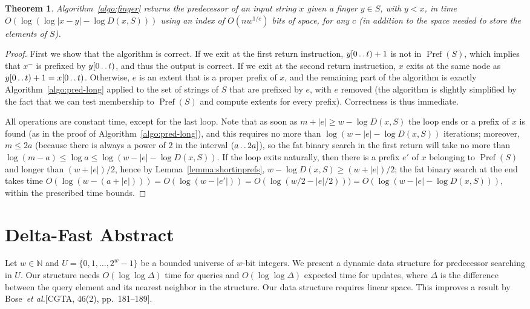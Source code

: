 \documentclass[a4paper,11pt]{article}
\newtheorem{theorem}{Theorem}[section]
\newcommand{\N}{\mathbb{N}}
\newcommand{\etal}{\emph{et al.}\xspace}
\newcommand{\?}{\mskip1.5mu}
\def\..{\,\mathpunct{\ldotp\ldotp}} %
\DeclareMathOperator{\Pref}{Pref}
\begin{document}
\begin{theorem}
\label{th:finger}
Algorithm~\ref{algo:finger} returns the predecessor of an input string $x$ given
a finger $y\in S$, with $y<x$, in time $O(\log(\log|x-y|-\log D(x,S)))$ using an 
index of $O(n w^{1/c})$ bits 
of space, for any $c$ (in addition to the space needed to store the elements of $S$).
\end{theorem}
\begin{proof}
First we show that the algorithm is correct. 
If we exit at the first return instruction, $y[0\..t)+1$ is
not in $\Pref(S)$, which implies that $x^-$ is prefixed by $y[0\..t)$, and thus
the output is correct. If we exit at the second return instruction, $x$
exits at the same node as $y[0\..t)+1=x[0\..t)$. Otherwise, $e$ is an extent
that is a proper prefix of $x$, and the remaining part of the algorithm
is exactly Algorithm~\ref{algo:pred-long} applied to the set of strings of $S$ 
that are prefixed by $e$, with $e$ removed (the algorithm is slightly
simplified by the fact that we can test membership to $\Pref(S)$ and compute
extents for every prefix). Correctness is thus immediate.

All operations are constant time, except for the last loop. Note that as soon as
$m+|e|\geq w-\log D(x,S)$ the loop ends or a prefix of $x$ is found (as in the
proof of Algorithm~\ref{algo:pred-long}), and this requires no more than $\log(w-|e|-\log
D(x,S))$ iterations; moreover, $m\leq 2a$ (because there is always
a power of $2$ in the interval $(a\..2a]$), so the fat binary search in the first
return will take no more than $\log(m-a)\leq \log a\leq \log (w-|e|-\log D(x,S))$.
If the loop exits naturally, then there is a prefix $e'$ of $x$ belonging
to $\Pref(S)$ and longer than $(w+|e|)/2$, hence by
Lemma~\ref{lemma:shortinprefs}, $w-\log D(x,S)\geq (w+|e|)/2$; the fat binary search at the
end takes time $O(\log (w-(a+|e|)))=O(\log (w-|e'|))=O(\log( w/2 -
|e|/2)))=O(\log(w-|e|-\log D(x,S)))$, within the prescribed time bounds.
\end{proof}

\section{Delta-Fast Abstract}
Let $w \in \N$ and $U = \{0, 1, \dots, 2^w-1\}$ be a 
bounded universe of $w$-bit integers.  We present a 
dynamic data structure for predecessor searching in 
$U$.  Our structure needs $O(\log \log \Delta)$ time 
for queries and $O(\log \log \Delta)$ expected time 
for updates, where $\Delta$ is the difference between 
the query element and its nearest neighbor in the 
structure. Our data structure requires linear space. 
This improves a result by Bose~\etal [CGTA, 46(2), pp.~181--189].
\end{document}

